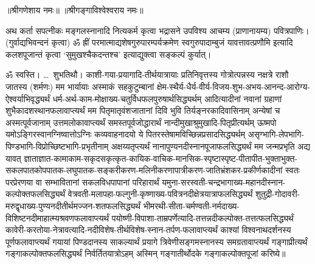 
\begin{center}
॥श्रीगणेशाय नमः॥ ॥श्रीगङ्गाविश्वेश्वराय नमः॥
\end{center}

अथ कर्ता सपत्नीकः मङ्गलस्नानादि नित्यकर्म कृत्वा भद्रासने उपविश्य आचम्य (प्राणानायम्य)
पवित्रपाणिः। (गुर्वाद्यभिवन्दनं कृत्वा) ॐ ह्रीं परमात्माद्यशेषगुरुपारम्पर्यक्रमेण
स्वगुरुपादाम्बुजं यावत्तावत्प्रणौमि इत्यादि कलशपूजान्तं कृत्वा `सुमुखश्चैकदन्तश्च' इत्याद्युक्त्वा
सङ्कल्पं कुर्यात्।


ॐ स्वस्ति। \ldots\ शुभतिथौ। काशी-गया-प्रयागादि-तीर्थयात्रायाः प्रतिनिवृत्तस्य \blank{}
गोत्रोत्पन्नस्य \blank{} नक्षत्रे \blank{} राशौ जातस्य \blank{} (शर्मणः) मम भार्यायाः \blank{}
अस्माकं सहकुटुम्बानां क्षेम-स्थैर्य-धैर्य-वीर्य-विजय-शुभ-अभय-आनन्द-आरोग्य-ऐश्वर्याभिवृद्ध्यर्थं
धर्म-अर्थ-काम-मोक्षाख्य-चतुर्विधफलपुरुषार्थसिद्ध्यर्थम् आदित्यादीनां नवानां ग्रहाणां
शुभैकादशस्थानफलावाप्त्यर्थं मम पितृमातृवंशजातानां दिवि भुवि तिर्यङ्नरकादिवासिनाम्
अन्येषां च अस्मत्पूर्वजानाम् उत्तमलोकावाप्त्यर्थं समस्तपूर्वजोद्धारार्थं
नान्दीमुखाश्रुमुखादि-पितृप्रीत्यर्थम् ऊष्मपो यमोऽङ्गिरस्वानग्निष्वात्तोऽग्निः कव्यवाहनादयो
ये पितरस्तेषामविच्छिन्नप्रसादसिद्ध्यर्थम् असृग्भागि-लेपभागि-पिण्डभागि-विप्रोच्छिष्टभागि-प्रभृतीनाम्
अक्षय्यतृप्त्यर्थं नानापुण्यनदीस्नानपूजाफलसिद्ध्यर्थं मम जन्मप्रभृति अद्य यावत्
ज्ञाताज्ञात-कामाकाम-सकृदसकृत्कृत-कायिक-वाचिक-मानसिक-स्पृष्टास्पृष्ट-पीतापीत-भुक्ताभुक्त-सकलपातकोपपातक-लघुपातक-सङ्करीकरण-मलिनीकरणापात्रीकरण-जातिभ्रंशकर-प्रकीर्णकादीनां
स्वतः परप्रेरणया वा सम्भावितानां सकलविधपापानां परिहारार्थं यमुना-सरस्वती-चन्द्रभागाख्य-महानदीस्नान-कल्पोक्तफलसिद्ध्यर्थं
वेत्रवती-मलापहा-फल्गुनी-कृष्णाख्य-पवित्रनदीक्षेत्रयात्राफलसिद्ध्यर्थं
शुतुद्री-गोदावरी-मरुद्वृधाख्य-पुण्यनदीतीर्थमज्जन-शतफलसिद्ध्यर्थं
भीमरथी-सीता-चर्मण्वती-नर्मदाख्य-विशिष्टनदीमाहात्म्यश्रवणफलावाप्त्यर्थं
पयोष्णी-विपाशा-ताम्रपर्णेत्यादि-तत्तन्नदीकल्पोक्त-तत्तत्फलसिद्ध्यर्थं
कावेरी-करतोया-नेत्रावत्यादि-नदीविशेष-तीर्थविशेष-स्नान-तर्पण-फलावाप्त्यर्थं
काश्यां विश्वनाथदर्शनस्य पूर्णफलावाप्त्यर्थं गयायां पिण्डदानस्य साकल्यार्थं
प्रयागे त्रिवेणीसङ्गमस्नानस्य समग्रतावाप्त्यर्थं गङ्गाप्रीत्यर्थं गङ्गाकल्पोक्तफलसिद्ध्यर्थं
निर्वर्तितयात्रोऽहम् अस्मिन् गङ्गातीर्थोदके गङ्गाकल्पोक्तपूजां करिष्ये॥

